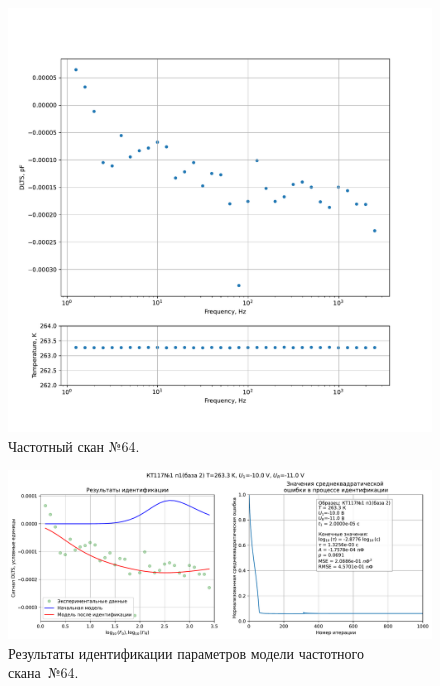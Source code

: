 \begin{figure}[!ht]
    \centering
    \includegraphics[width=1\textwidth]{../plots/КТ117№1_п1(база 2)_2500Гц-1Гц_1пФ_-10С_-10В-11В_10мВ_20мкс_шаг_0,1.pdf}
    \caption{Частотный скан №64.}
    \label{pic:frequency_scan_64}
\end{figure}

\begin{figure}[!ht]
    \centering
    \includegraphics[width=1\textwidth]{../plots/КТ117№1_п1(база 2)_2500Гц-1Гц_1пФ_-10С_-10В-11В_10мВ_20мкс_шаг_0,1_model.pdf}
    \caption{Результаты идентификации параметров модели частотного скана~№64.}
    \label{pic:frequency_scan_model64}
\end{figure}

\pagebreak


